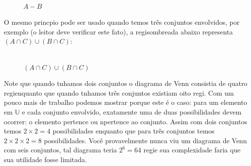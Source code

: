\def\rectangle{(-3,-2) rectangle (5,2)}
\def\firstcircle{(0,0) circle (1.5cm)}
\def\secondcircle{(60:2cm) circle (1.5cm)}
\def\thirdcircle{(0:2cm) circle (1.5cm)}
\begin{figure}[h]
\centering
{}
\\
$A - B$
\end{figure}
O mesmo princ\ih pio pode ser usado quando temos tr\^es conjuntos envolvidos, por exemplo (o leitor deve verificar este fato), a regi\ao sombreada abaixo representa $(A\cap C)\cup(B\cap C)$:

\def\rectangle{(-3,-2) rectangle (5,3.9)}
\def\firstcircle{(0,0) circle (1.5cm)}
\def\secondcircle{(60:2cm) circle (1.5cm)}
\def\thirdcircle{(0:2cm) circle (1.5cm)}
\begin{figure}[h]
\centering
\\
$(A\cap C)\cup(B\cap C)$
\end{figure}
Note que quando t\ih nhamos dois conjuntos o diagrama de Venn consistia de quatro regi\oes enquanto que quando t\ih nhamos tr\^es conjuntos existiam oito regi\ois. Com um pouco mais de trabalho podemos mostrar porque este \'e o caso: para um elemento em $\mathbb{U}$ e cada conjunto envolvido, exatamente uma de duas possibilidades devem ocorrer: o elemento pertence ou n\ao pertence ao conjunto. Assim com dois conjuntos temos $2\times 2=4$ possibilidades enquanto que para tr\^es conjuntos temos $2\times 2\times 2=8$ possibilidades. Voc\^e provavelmente nunca viu um diagrama de Venn com seis conjuntos, tal diagrama teria $2^6=64$ regi\oes e sua complexidade faria que sua utilidade fosse limitada.

